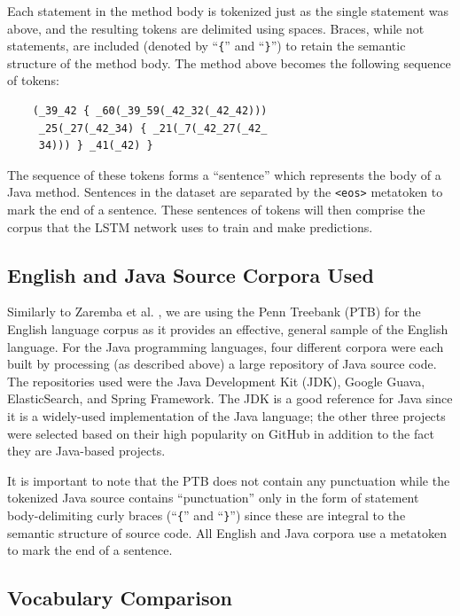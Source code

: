 \documentclass[runningheads,a4paper]{llncs}
\begin{document}
Each statement in the method body is tokenized just as the single statement 
was above, and the resulting tokens are delimited using spaces. Braces, while not 
statements, are included (denoted by ``\texttt\{'' and
``\texttt\}'') to retain the semantic structure of the method body. 
The method above becomes the following sequence of tokens:

\begin{verbatim}
    (_39_42 { _60(_39_59(_42_32(_42_42)))
     _25(_27(_42_34) { _21(_7(_42_27(_42_
     34))) } _41(_42) } 
\end{verbatim}

The sequence of these tokens forms a ``sentence'' which  
represents the body of a Java method.
Sentences in the dataset are separated by the \texttt{<eos>} metatoken
to mark the end of a sentence.
These sentences of
tokens will then comprise the corpus that the LSTM network uses to train 
and make predictions.


\subsection{English and Java Source Corpora Used}

Similarly to Zaremba et al. \cite{Zaremba}, we are using the Penn Treebank (PTB) for the
English language corpus as it provides an effective, general sample of the English
language.
For the Java programming languages, four different corpora were each built
by processing (as described above) a large repository of Java source code. The
repositories used were
the Java Development Kit (JDK), Google Guava, ElasticSearch, and Spring Framework.
The JDK is a good reference for Java since it is a widely-used implementation
of the Java language; the other three projects were selected based on their
high popularity on GitHub in addition to the fact they are
Java-based projects.

It is important to note that the
PTB does not contain any punctuation while the tokenized
Java source contains ``punctuation'' only in the form of statement
body-delimiting curly braces (``\texttt\{'' and ``\texttt\}'')
since these are integral to the semantic structure of source code.
All English and Java corpora use a metatoken to mark the end of a sentence.

\subsection{Vocabulary Comparison}
\end{document}
